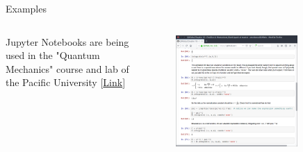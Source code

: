 \documentclass[11pt,t]{beamer}
\begin{document}
\begin{frame}[fragile]{Examples}  

	\begin{columns}[t]
		\begin{column}{.3\textwidth}
		Jupyter Notebooks are being used in the "Quantum Mechanics" course and lab of the Pacific University [\href{https://github.com/amcdawes/QMlabs}{Link}]
	
 
		\end{column}
		\begin{column}{.7\textwidth}
			\vspace{-55pt}
			\begin{figure}
			\centering
			\includegraphics[width=0.80\textwidth]{jupyter_ex_qm}
			
			\end{figure}
		\end{column}
	\end{columns}	
		
\end{frame}
\end{document}
